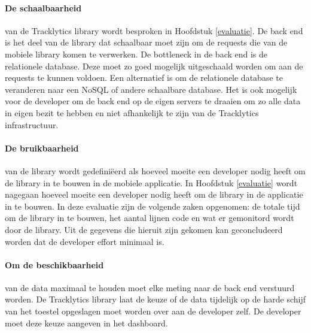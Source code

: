 \paragraph{De schaalbaarheid} van de Tracklytics library wordt besproken in Hoofdstuk \ref{evaluatie}. De back end is het deel van de library dat schaalbaar moet zijn om de requests die van de mobiele library komen te verwerken. De bottleneck in de back end is de relationele database. Deze moet zo goed mogelijk uitgeschaald worden om aan de requests te kunnen voldoen. Een alternatief is om de relationele database te veranderen naar een NoSQL of andere schaalbare database. Het is ook mogelijk voor de developer om de back end op de eigen servers te draaien om zo alle data in eigen bezit te hebben en niet afhankelijk te zijn van de Tracklytics infrastructuur.\\


\paragraph{De bruikbaarheid} van de library wordt gedefini\"eerd als hoeveel moeite een developer nodig heeft om de library in te bouwen in de mobiele applicatie. In Hoofdstuk \ref{evaluatie} wordt nagegaan hoeveel moeite een developer nodig heeft om de library in de applicatie in te bouwen. In deze evaluatie zijn de volgende zaken opgenomen: de totale tijd om de library in te bouwen, het aantal lijnen code en wat er gemonitord wordt door de library. Uit de gegevens die hieruit zijn gekomen kan geconcludeerd worden dat de developer effort minimaal is.

\paragraph{Om de beschikbaarheid} van de data maximaal te houden moet elke meting naar de back end verstuurd worden. De Tracklytics library laat de keuze of de data tijdelijk op de harde schijf van het toestel opgeslagen moet worden over aan de developer zelf. De developer moet deze keuze aangeven in het dashboard. \\

